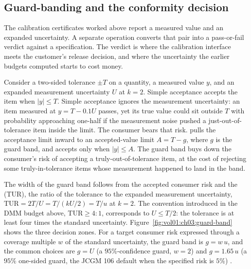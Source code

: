 \subsection{Guard-banding and the conformity decision}

The calibration certificates worked above report a measured value
and an expanded uncertainty. A separate operation converts that pair
into a pass-or-fail verdict against a specification. The verdict is
where the calibration interface meets the customer's release
decision, and where the uncertainty the earlier budgets computed
starts to cost money.

Consider a two-sided tolerance $\pm T$ on a quantity, a measured
value $y$, and an expanded measurement uncertainty $U$ at $k = 2$.
Simple acceptance accepts the item when $|y| \leq T$. Simple
acceptance ignores the measurement uncertainty: an item measured at
$y = T - 0.1U$ passes, yet its true value could sit outside $T$ with
probability approaching one-half if the measurement noise pushed a
just-out-of-tolerance item inside the limit. The consumer bears that
risk.  pulls the acceptance limit inward to
an accepted-value limit $A = T - g$, where $g$ is the guard band,
and accepts only when $|y| \leq A$. The guard band buys down the
consumer's risk of accepting a truly-out-of-tolerance item, at the
cost of rejecting some truly-in-tolerance items whose measurement
happened to land in the band.



The width of the guard band follows from the accepted consumer risk
and the  (TUR), the ratio of the
tolerance to the expanded measurement uncertainty,
$\mathrm{TUR} = 2T/U = T/(kU/2) = T/u$ at $k = 2$. The convention
introduced in the DMM budget above, $\mathrm{TUR} \geq 4{:}1$,
corresponds to $U \leq T/2$: the tolerance is at least four times
the standard uncertainty. Figure~\ref{fig:vol01:ch03:guard-band}
shows the three decision zones. For a target consumer risk expressed
through a coverage multiple $w$ of the standard uncertainty, the
guard band is $g = w\,u$, and the common choices are $g = U$ (a
$95\%$-confidence guard, $w = 2$) and $g = 1.65\,u$ (a $95\%$
one-sided guard, the JCGM 106 default when the specified risk is
$5\%$) \cite{std:ch03t3-jcgm-100-2008}.

